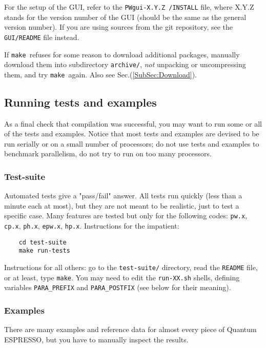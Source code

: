 \documentclass[12pt,a4paper]{article}
\def\qe{{\sc Quantum ESPRESSO}}
\def\pwx{\texttt{pw.x}}
\def\cpx{\texttt{cp.x}}
\def\phx{\texttt{ph.x}}
\def\epwx{\texttt{epw.x}}
\def\make{\texttt{make}}
\begin{document}
For the setup of the GUI, refer to the \texttt{PWgui-X.Y.Z /INSTALL} file, where
X.Y.Z stands for the version number of the GUI (should be the same as the
general version number). If you are using sources from the git repository, see
the \texttt{GUI/README} file instead.

If \make\ refuses for some reason to download additional
packages, manually download them into subdirectory
\texttt{archive/}, {\em not} unpacking or uncompressing them,
and try \make\ again. Also see Sec.(\ref{SubSec:Download}).

\subsection{Running tests and examples}
\label{SubSec:TestsExamples}

As a final check that compilation was successful, you may want to run some or
all of the tests and examples.
Notice that most tests and examples are devised to be run serially
or on a small number of processors; do not use tests and examples
to benchmark parallelism, do not try to run on too many processors.

\subsubsection{Test-suite}
Automated tests give a "pass/fail" answer. All tests run quickly
(less than a minute each at most), but they are not meant to be realistic,
just to test a specific case. Many features are tested but only for
the following codes: \pwx, \cpx, \phx, \epwx, \texttt{hp.x}.
Instructions for the impatient:
\begin{verbatim}
    cd test-suite
    make run-tests
\end{verbatim}
Instructions for all others: go to the \texttt{test-suite/} directory,
read the \texttt{README} file, or at least, type \make. You may need
to edit the \texttt{run-XX.sh} shells, defining variables
\texttt{PARA\_PREFIX} and \texttt{PARA\_POSTFIX} (see below for their
meaning).

\subsubsection{Examples}
\label{SubSec:Examples}
There are many examples and reference data for almost every piece of \qe,
but you have to manually inspect the results.
\end{document}
